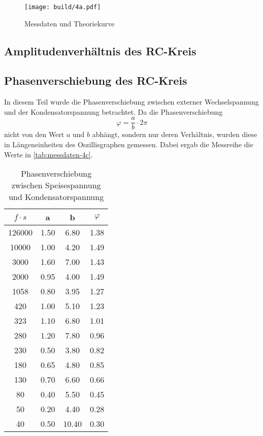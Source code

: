 \begin{figure}
	\centering
	\texttt{[image: build/4a.pdf]}
	\caption{Messdaten und Theoriekurve}
	\label{fig:plot-4a}
\end{figure}

\subsection{Amplitudenverhältnis des RC-Kreis}
\label{sec:4b-auswertung}

\subsection{Phasenverschiebung des RC-Kreis}
\label{sec:4c-auswertung}

In diesem Teil wurde die Phasenverschiebung zwischen externer Wechselspannung und der 
Kondensatorspannung betrachtet. Da die Phasenverschiebung
\begin{equation}
	\varphi = \frac{a}{b} \cdot 2\pi
\end{equation}
nicht von den Wert $a$ und $b$ abhängt, sondern nur deren Verhältnis, wurden diese
in Längeneinheiten des Oszillisgraphen gemessen. Dabei ergab die Messreihe die Werte in 
\autoref{tab:messdaten-4c}.

\begin{table}
	\centering
	\caption{Phasenverschiebung zwischen Speisespannung und Kondensatorspannung}
	\label{tab:messdaten-4c}
	\begin{tabular}{c c c c}
		\toprule
		$f \cdot \si{s}$ &  a & b & $\varphi$ \\
		\midrule
		126000	&  1.50  &	 6.80  &	1.38 \\
		 10000	&  1.00  &	 4.20  &	1.49 \\
		  3000	&  1.60  &	 7.00  &	1.43 \\
		  2000	&  0.95  &	 4.00  &	1.49 \\
		1058  	&  0.80  &	 3.95  &	1.27 \\
		   420	&  1.00  &	 5.10  &	1.23 \\
		   323	&  1.10  &	 6.80  &	1.01 \\
		   280	&  1.20  &	 7.80  &	0.96 \\
		   230	&  0.50  &	 3.80  &	0.82 \\
		   180	&  0.65  &	 4.80  &	0.85 \\
		   130	&  0.70  &	 6.60  &	0.66 \\
		    80	&  0.40  &	 5.50  &	0.45 \\
		    50	&  0.20  &	 4.40  &	0.28 \\
		    40	&  0.50  &	10.40  &	0.30 \\
		\bottomrule
	\end{tabular}
\end{table}

